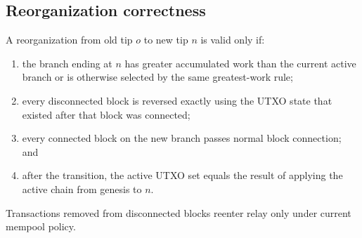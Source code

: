 \subsection{Reorganization correctness}

A reorganization from old tip $o$ to new tip $n$ is valid only if:

\begin{enumerate}[leftmargin=*]
  \item the branch ending at $n$ has greater accumulated work than the current
        active branch or is otherwise selected by the same greatest-work rule;
  \item every disconnected block is reversed exactly using the UTXO state that
        existed after that block was connected;
  \item every connected block on the new branch passes normal block connection;
        and
  \item after the transition, the active UTXO set equals the result of applying
        the active chain from genesis to $n$.
\end{enumerate}

Transactions removed from disconnected blocks reenter relay only under current
mempool policy.
